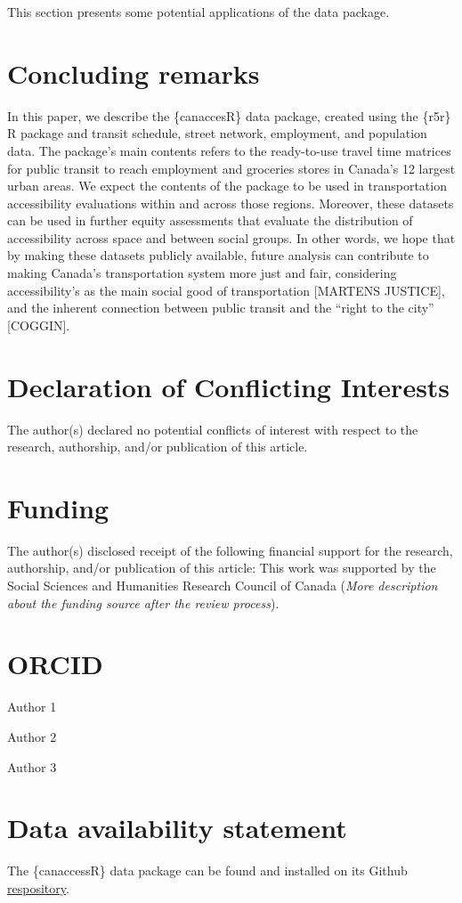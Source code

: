 \documentclass[Royal,times,sageh]{sagej}
\begin{document}
This section presents some potential applications of the data package.

\section{Concluding remarks}\label{concluding-remarks}

In this paper, we describe the \{canaccesR\} data package, created using
the \{r5r\} R package and transit schedule, street network, employment,
and population data. The package's main contents refers to the
ready-to-use travel time matrices for public transit to reach employment
and groceries stores in Canada's 12 largest urban areas. We expect the
contents of the package to be used in transportation accessibility
evaluations within and across those regions. Moreover, these datasets
can be used in further equity assessments that evaluate the distribution
of accessibility across space and between social groups. In other words,
we hope that by making these datasets publicly available, future
analysis can contribute to making Canada's transportation system more
just and fair, considering accessibility's as the main social good of
transportation {[}MARTENS JUSTICE{]}, and the inherent connection
between public transit and the ``right to the city'' {[}COGGIN{]}.

\section{Declaration of Conflicting
Interests}\label{declaration-of-conflicting-interests}

The author(s) declared no potential conflicts of interest with respect
to the research, authorship, and/or publication of this article.

\section{Funding}\label{funding}

The author(s) disclosed receipt of the following financial support for
the research, authorship, and/or publication of this article: This work
was supported by the Social Sciences and Humanities Research Council of
Canada (\emph{More description about the funding source after the review
process}).

\section{ORCID}\label{orcid}

Author 1

Author 2

Author 3

\section{Data availability statement}\label{data-availability-statement}

The \{canaccessR\} data package can be found and installed on its Github
\href{https://github.com/paezha/canaccessR}{respository}.



\end{document}
